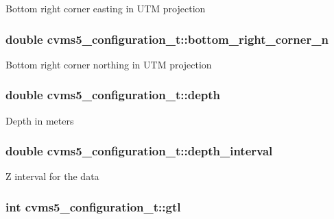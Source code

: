 Bottom right corner easting in U\+T\+M projection \hypertarget{structcvms5__configuration__t_ab9a24ff06eff22e4c9c499eb0921ff3c}{
\subsubsection[{bottom\+\_\+right\+\_\+corner\+\_\+n}]{\setlength{\rightskip}{0pt plus 5cm}double cvms5\+\_\+configuration\+\_\+t\+::bottom\+\_\+right\+\_\+corner\+\_\+n}}\label{structcvms5__configuration__t_ab9a24ff06eff22e4c9c499eb0921ff3c}
Bottom right corner northing in U\+T\+M projection \hypertarget{structcvms5__configuration__t_ae06d0ad6271283e4ffeea1bc7d81f0f9}{
\subsubsection[{depth}]{\setlength{\rightskip}{0pt plus 5cm}double cvms5\+\_\+configuration\+\_\+t\+::depth}}\label{structcvms5__configuration__t_ae06d0ad6271283e4ffeea1bc7d81f0f9}
Depth in meters \hypertarget{structcvms5__configuration__t_a6a1a8d114cc3bdc97db06078a7c648f5}{
\subsubsection[{depth\+\_\+interval}]{\setlength{\rightskip}{0pt plus 5cm}double cvms5\+\_\+configuration\+\_\+t\+::depth\+\_\+interval}}\label{structcvms5__configuration__t_a6a1a8d114cc3bdc97db06078a7c648f5}
Z interval for the data \hypertarget{structcvms5__configuration__t_a8fef888b1572b763843fff7a07a29a2e}{
\subsubsection[{gtl}]{\setlength{\rightskip}{0pt plus 5cm}int cvms5\+\_\+configuration\+\_\+t\+::gtl}}\label{structcvms5__configuration__t_a8fef888b1572b763843fff7a07a29a2e}
